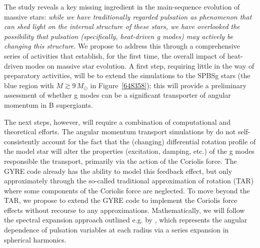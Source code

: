 The \citet{Townsend:2017} study reveals a key missing ingredient in the main-sequence evolution of massive stars: \emph{while we have traditionally regarded pulsation as phenomenon that can shed light on the internal structure of these stars, we have overlooked the possibility that pulsation (specifically, heat-driven g modes) may actively be changing this structure}. We propose to address this through a comprehensive series of activities that establish, for the first time, the overall impact of heat-driven modes on massive star evolution. A first step, requiring little in the way of preparatory activities, will be to extend the \citet{Townsend:2017} simulations to the SPBSg stars (the blue region with $M \gtrsim 9\,M_{\odot}$ in Figure~\ref{648358}); this will provide a preliminary assessment of whether g modes can be a significant transporter of angular momentum in B supergiants.

The next steps, however, will require a combination of computational and theoretical efforts.
The angular momentum transport simulations by \citet{Townsend:2017} do not self-consistently account for the fact that the (changing) differential rotation profile of the model star will alter the properties (excitation, damping, etc.) of the g modes responsible the transport, primarily via the action of the Coriolis force. The GYRE code already has the ability to model this feedback effect, but only approximately through the so-called traditional approximation of rotation (TAR) where some components of the Coriolis force are neglected. To move beyond the TAR, we propose to extend the GYRE code to implement the Coriolis force effects without recourse to any approximations. Mathematically, we will follow the spectral expansion approach outlined e.g. by \citet{Lee:2001}, which represents the angular dependence of pulsation variables at each radius via a series expansion in spherical harmonics. 



